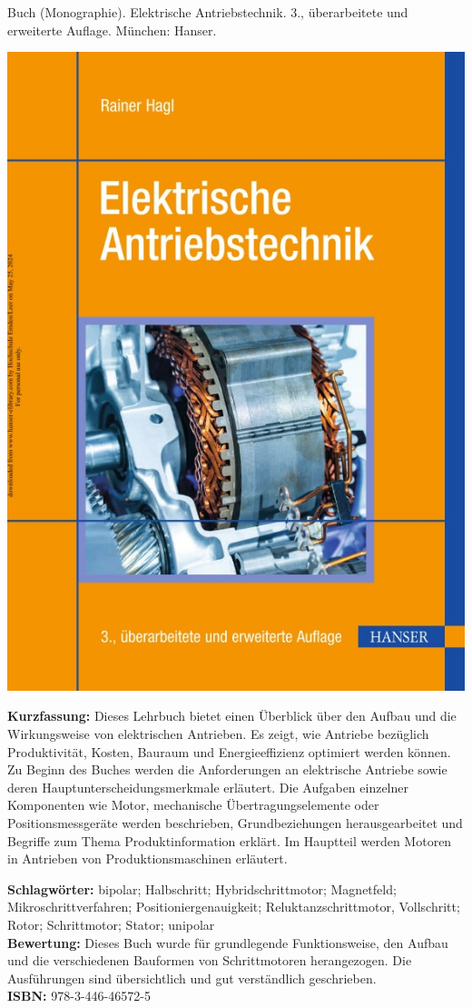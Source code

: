 {
Buch (Monographie). Elektrische Antriebstechnik.
3., überarbeitete und erweiterte Auflage. München: Hanser. \\
\begin{minipage}{0.38\textwidth}
	\includegraphics[width=\linewidth]{images/Hagl.jpg}
\end{minipage}
\hfill
\begin{minipage}{0.6\textwidth}
\textbf{Kurzfassung:}
Dieses Lehrbuch bietet einen Überblick über den Aufbau und die Wirkungsweise von elektrischen Antrieben. Es zeigt, wie Antriebe bezüglich Produktivität, Kosten, Bauraum und Energieeffizienz optimiert werden können. Zu Beginn des Buches werden die Anforderungen an elektrische Antriebe sowie deren Hauptunterscheidungsmerkmale erläutert. Die Aufgaben einzelner Komponenten wie Motor, mechanische Übertragungselemente oder Positionsmessgeräte werden beschrieben, Grundbeziehungen herausgearbeitet und Begriffe zum Thema Produktinformation erklärt. Im Hauptteil werden Motoren in Antrieben von Produktionsmaschinen erläutert.
\end{minipage}
\textbf{Schlagwörter:}
bipolar; Halbschritt; Hybridschrittmotor; Magnetfeld; Mikroschrittverfahren; Positioniergenauigkeit; Reluktanzschrittmotor, Vollschritt; Rotor; Schrittmotor; Stator; unipolar
\\ \textbf{Bewertung:}
Dieses Buch wurde für grundlegende Funktionsweise, den Aufbau und die verschiedenen Bauformen von Schrittmotoren herangezogen. Die Ausführungen sind übersichtlich und gut verständlich geschrieben.
\\ \textbf{ISBN:}
978-3-446-46572-5
}

